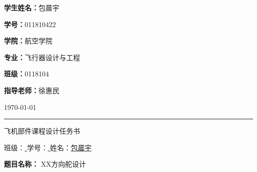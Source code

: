\begin{titlepage}
    \vspace{0.03\textheight} 
    
    
    {\Huge \textbf{学生姓名：}包晨宇}
    
    \vspace{0.03\textheight} 

    {\Huge \textbf{学号：}011810422}

    \vspace{0.03\textheight} 
    
    {\Huge \textbf{学院：}航空学院}
    \vspace{0.03\textheight} 
    
    {\Huge \textbf{专业：}飞行器设计与工程}
    \vspace{0.03\textheight} 
    
    {\Huge \textbf{班级：}0118104}
    \vspace{0.03\textheight} 
    
    {\Huge \textbf{指导老师：}徐惠民}

    \vfill  %

    {\Large \today}
    \vspace{0.02\textheight}  %


    \rule{\textwidth}{1pt}  %

\end{titlepage}



\newpage
\begin{centering}

    {\large 飞机部件课程设计任务书}

\end{centering}


\centerline{    
    班级：\underline{\quad{} \quad\quad}
    \quad\quad
    学号：\underline{\quad{} \quad\quad}
    \quad\quad
    姓名：\underline{\quad\quad 包晨宇 \quad\quad}
}

\noindent \textbf{题目名称：} XX方向舵设计



